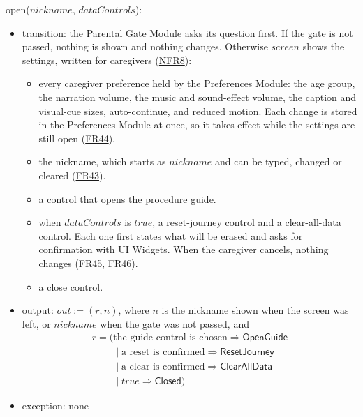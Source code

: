 \documentclass[10pt, titlepage]{article}
\newcommand{\srsurl}{https://team-hindsight.github.io/ophthamology-game/SRS/SRS.pdf}
\newcommand{\srsitemref}[2]{\href{\srsurl\#nameddest=#1}{#2}}
\newcommand{\T}[1]{\mathit{#1}}          %
\newcommand{\V}[1]{\mathsf{#1}}          %
\newcommand{\out}{\mathit{out}}
\newcommand{\true}{\mathit{true}}
\begin{document}
\begin{samepage}
\noindent open($\T{nickname}$, $\T{dataControls}$):
\begin{itemize}
\item transition: the Parental Gate Module asks its question first. If the
  gate is not passed, nothing is shown and nothing changes. Otherwise
  $\T{screen}$ shows the settings, written for caregivers
  (\srsitemref{NFR_Language}{NFR8}):
  \begin{itemize}
  \item every caregiver preference held by the Preferences Module: the age
    group, the narration volume, the music and sound-effect volume, the
    caption and visual-cue sizes, auto-continue, and reduced motion. Each
    change is stored in the Preferences Module at once, so it takes effect
    while the settings are still open (\srsitemref{FR_Preferences}{FR44}).
  \item the nickname, which starts as $\T{nickname}$ and can be typed,
    changed or cleared (\srsitemref{FR_Nickname}{FR43}).
  \item a control that opens the procedure guide.
  \item when $\T{dataControls}$ is $\true$, a reset-journey control and a
    clear-all-data control. Each one first states what will be erased and asks
    for confirmation with UI Widgets. When the caregiver cancels, nothing
    changes (\srsitemref{FR_ResetJourney}{FR45},
    \srsitemref{FR_ClearAllData}{FR46}).
  \item a close control.
  \end{itemize}
\item output: $\out := (r, n)$, where $n$ is the nickname shown when the
  screen was left, or $\T{nickname}$ when the gate was not passed, and
  \[\begin{array}{l}
  r = (\text{the guide control is chosen} \Rightarrow \V{OpenGuide}\\
  \phantom{r = (}\mid \text{a reset is confirmed} \Rightarrow
  \V{ResetJourney}\\
  \phantom{r = (}\mid \text{a clear is confirmed} \Rightarrow
  \V{ClearAllData}\\
  \phantom{r = (}\mid \true \Rightarrow \V{Closed})
  \end{array}\]
\item exception: none
\end{itemize}
\end{samepage}
\par\pagebreak[0]
\end{document}
